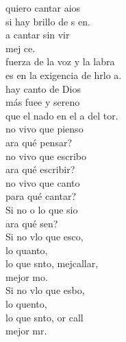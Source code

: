 \documentclass[12pt]{article}
\begin{document}
\begin{multicols*}{2}
\begin{cancion}%
	quiero cantar aios  \\
	si  hay brillo de s en.  \\
	a cantar sin vir  \\
	mej  ce. \\
\jump
	fuerza de la voz y la labra  \\
	es en la exigencia de hrlo a. \\
	hay canto de Dios \\
	más fuee y sereno\\
	que el nado en el a del tor. \\
\jump
	no vivo que pienso\\
	ara qué pensar? \\
	no vivo que escribo \\
	ara qué escribir? \\
	no vivo que canto\\
	para qué cantar?\\
	Si no o lo que sio \\
	ara qué sen?\\
\jump
	Si no vlo que esco,\\
	lo quanto,  \\
	lo que snto, mejcallar,\\
	mejor mo.\\
	Si no vlo que esbo, \\
	lo quento,  \\
	lo que snto, or call\\
	mejor mr. \\
\end{cancion}%


\end{multicols*}
\end{document}
